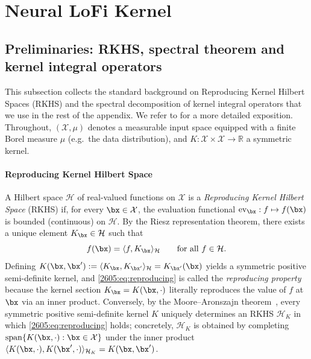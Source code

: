 \section{Neural LoFi Kernel}

\label{2605:app:kernel-nlofi}

\subsection{Preliminaries: RKHS, spectral theorem and kernel integral operators}\label{2605:app:rkhs-prelims}

This subsection collects the standard background on Reproducing Kernel Hilbert Spaces (RKHS) and the spectral decomposition of kernel integral operators that we use in the rest of the appendix.
We refer to \cite{scholkopf2002learning,steinwart2008support} for a more detailed exposition. Throughout, $(\mathcal{X},\mu)$ denotes a measurable input space equipped with a finite Borel measure $\mu$ (e.g.\ the data distribution), and $K:\mathcal{X}\times\mathcal{X}\to\mathbb{R}$ a symmetric kernel.

\paragraph{Reproducing Kernel Hilbert Space}
A Hilbert space $\mathcal{H}$ of real-valued functions on $\mathcal{X}$ is a \emph{Reproducing Kernel Hilbert Space} (RKHS) if, for every $\bx\in\mathcal{X}$, the evaluation functional $\mathrm{ev}_\bx:f\mapsto f(\bx)$ is bounded (continuous) on $\mathcal{H}$. By the Riesz representation theorem, there exists a unique element $K_\bx\in\mathcal{H}$ such that
\begin{equation}\label{2605:eq:reproducing}
  f(\bx)=\langle f,K_\bx\rangle_{\mathcal{H}}\qquad\text{for all }f\in\mathcal{H}.
  \end{equation}
  Defining $K(\bx,\bx'):=\langle K_\bx,K_{\bx'}\rangle_{\mathcal{H}}=K_{\bx'}(\bx)$ yields a symmetric positive semi-definite kernel, and \eqref{2605:eq:reproducing} is called the \emph{reproducing property} because the kernel section $K_\bx=K(\bx,\cdot)$ literally reproduces the value of $f$ at $\bx$ via an inner product. Conversely, by the Moore--Aronszajn theorem~\cite{aronszajn1950theory}, every symmetric positive semi-definite kernel $K$ uniquely determines an RKHS $\mathcal{H}_K$ in which \eqref{2605:eq:reproducing} holds; concretely, $\mathcal{H}_K$ is obtained by completing $\mathrm{span}\{K(\bx,\cdot):\bx\in\mathcal{X}\}$ under the inner product $\langle K(\bx,\cdot),K(\bx',\cdot)\rangle_{\mathcal{H}_K}=K(\bx,\bx')$.


